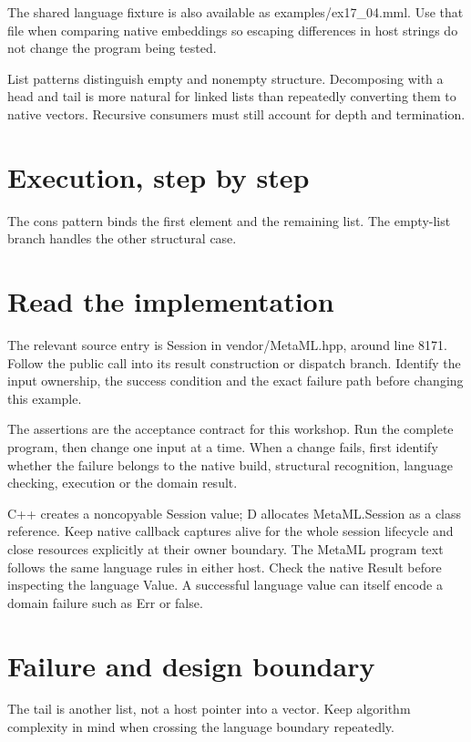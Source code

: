 The shared language fixture is also available as examples/ex17\_04.mml. Use that file when comparing native embeddings so escaping differences in host strings do not change the program being tested.

\clearpage
{}
List patterns distinguish empty and nonempty structure. Decomposing with a head and tail is more natural for linked lists than repeatedly converting them to native vectors. Recursive consumers must still account for depth and termination.


\section*{Execution, step by step}
The cons pattern binds the first element and the remaining list. The empty-list branch handles the other structural case.

\section*{Read the implementation}
The relevant source entry is Session in vendor/MetaML.hpp, around line 8171. Follow the public call into its result construction or dispatch branch. Identify the input ownership, the success condition and the exact failure path before changing this example.

The assertions are the acceptance contract for this workshop. Run the complete program, then change one input at a time. When a change fails, first identify whether the failure belongs to the native build, structural recognition, language checking, execution or the domain result.

\clearpage
{}
C++ creates a noncopyable Session value; D allocates MetaML.Session as a class reference. Keep native callback captures alive for the whole session lifecycle and close resources explicitly at their owner boundary. The MetaML program text follows the same language rules in either host. Check the native Result before inspecting the language Value. A successful language value can itself encode a domain failure such as Err or false.


\section*{Failure and design boundary}
The tail is another list, not a host pointer into a vector. Keep algorithm complexity in mind when crossing the language boundary repeatedly.

